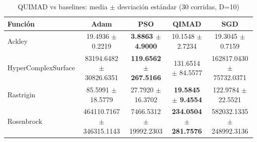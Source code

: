 \begin{table}[h]
\centering
\caption{QUIMAD vs baselines: media $\pm$ desviación estándar (30 corridas, D=10)}
\begin{tabular}{lcccc}
\hline
Función & Adam & PSO & QIMAD & SGD \\
\hline
Ackley & 19.4936 $\pm$ 0.2219 & \textbf{3.8863 $\pm$ 4.9000} & 10.1548 $\pm$ 2.7234 & 19.3045 $\pm$ 0.7159 \\
HyperComplexSurface & 83194.6482 $\pm$ 30826.6351 & \textbf{119.6562 $\pm$ 267.5166} & 131.6514 $\pm$ 84.5577 & 162817.0430 $\pm$ 75732.0371 \\
Rastrigin & 85.5991 $\pm$ 18.5779 & 27.7920 $\pm$ 16.3702 & \textbf{19.5845 $\pm$ 9.4554} & 122.9784 $\pm$ 22.5521 \\
Rosenbrock & 464110.7167 $\pm$ 346315.1143 & 7466.5312 $\pm$ 19992.2303 & \textbf{234.0504 $\pm$ 281.7576} & 582032.1335 $\pm$ 248992.3136 \\
\hline
\end{tabular}
\end{table}